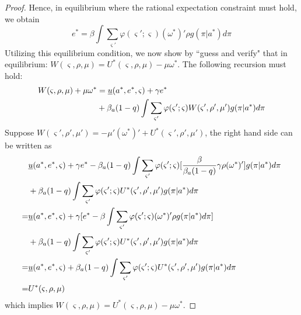 \documentclass[12pt,letter,leqno]{article}
\theoremstyle{asn}
\theoremstyle{lem}
\theoremstyle{slem}
\theoremstyle{prop}
\theoremstyle{appprop}
\theoremstyle{rem}
\theoremstyle{defn}
\begin{document}
\begin{proof}
Hence, in equilibrium where the rational expectation constraint must hold, we obtain 
\begin{equation*}
e^*=\beta \int \sum_{\varsigma '}\varphi (\varsigma ';\varsigma)(\omega^*)'\rho g(\pi|a^*)d\pi
\end{equation*}
Utilizing this equilibrium condition, we now show by ``guess and verify" that in equilibrium: $W(\varsigma,\rho,\mu) = U^*(\varsigma,\rho,\mu) - \mu\omega^{\ast }$.
The following recursion must hold:
\begin{align}
W(\varsigma,\rho,\mu)+\mu\omega^{\ast } &= \uline{u}(a^{\ast }, e^*,\varsigma) + \gamma e^* \label{eq:WU} \\
&+ \beta_{a}(1-q)\int
\sum_{\varsigma '}\varphi (\varsigma ';\varsigma)W(\varsigma
',\rho ',\mu ')g(\pi|a^*)d\pi  \notag
\end{align}
Suppose $W(\varsigma',\rho ',\mu ')=-\mu'(\omega^*)' + U^*(\varsigma
',\rho ',\mu ')$, the right hand side can be written as
\begin{align}
&\uline{u}(a^{\ast }, e^*,\varsigma) + \gamma e^* -  \beta_{a}(1-q)\int
\sum_{\varsigma '}\varphi (\varsigma ';\varsigma)[\frac{\beta}{\beta_a(1-q)}\gamma \rho (\omega^*)']g(\pi|a^*)d\pi\notag \\
&+ \beta_{a}(1-q)\int
\sum_{\varsigma '}\varphi (\varsigma ';\varsigma)U^*(\varsigma
',\rho ',\mu ')g(\pi|a^*)d\pi  \notag\\
=& \uline{u}(a^{\ast }, e^{\ast },\varsigma) + \gamma[e^*-\beta \int \sum_{\varsigma '}\varphi (\varsigma ';\varsigma)(\omega^*)'\rho g(\pi|a^*)d\pi] \notag \\
&+ \beta_{a}(1-q)\int
\sum_{\varsigma '}\varphi (\varsigma ';\varsigma)U^*(\varsigma
',\rho ',\mu ')g(\pi|a^*)d\pi  \notag \\
=& \uline{u}(a^{\ast }, e^{\ast },\varsigma) + \beta_{a}(1-q)\int
\sum_{\varsigma '}\varphi (\varsigma ';\varsigma)U^*(\varsigma
',\rho ',\mu ')g(\pi|a^*)d\pi  \notag \\
=&U^*(\varsigma,\rho
,\mu) \notag
\end{align}
which implies $W(\varsigma,\rho
,\mu) = U^*(\varsigma,\rho
,\mu) - \mu\omega^{\ast }$.\end{proof}
\end{document}
